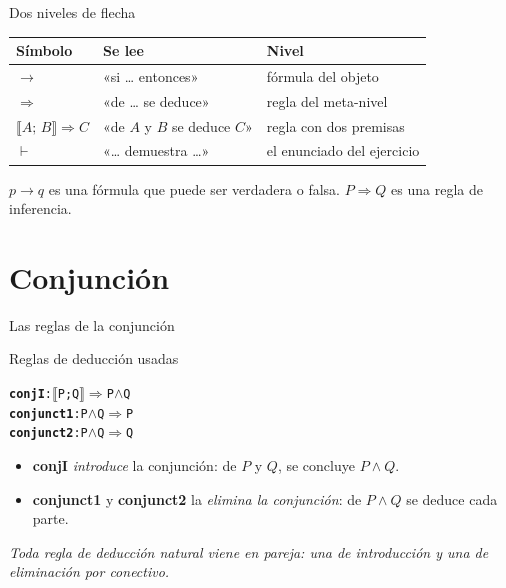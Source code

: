\documentclass[11pt,aspectratio=169]{beamer}
\newcommand{\sAnd}{\(\wedge\)}
\newcommand{\sMeta}{\(\Longrightarrow\)}
\newcommand{\sLb}{\(\llbracket\)}
\newcommand{\sRb}{\(\rrbracket\)}
\newcommand{\Rn}[1]{\textcolor{granate}{\textbf{#1}}}
\newcommand{\nota}[1]{{\small\itshape\color{gray} #1}}
\begin{document}
\begin{frame}{Dos niveles de flecha}
  \begin{center}
  \begin{tabular}{lll}
    \toprule
    \bfseries Símbolo & \bfseries Se lee & \bfseries Nivel\\
    \midrule
    \pause
    $\longrightarrow$ & «si \ldots{} entonces» & fórmula del \alert{objeto}\\
    \pause
    $\Longrightarrow$ & «de \ldots{} se deduce» & regla del \alert{meta-nivel}\\
    \pause
    $\llbracket A;\, B \rrbracket \Longrightarrow C$ & «de $A$ y $B$ se deduce $C$» & regla con dos premisas\\
    \pause
    $\vdash$ & «\ldots{} demuestra \ldots» & el enunciado del ejercicio\\
    \bottomrule
  \end{tabular}
  \end{center}
  \vfill
  \pause
  \begin{center}
    \alert{$p \longrightarrow q$ es una fórmula que puede ser verdadera o
    falsa. $P \Longrightarrow Q$ es una regla de inferencia.}
  \end{center}
\end{frame}

\section{Conjunción}

\begin{frame}[fragile]{Las reglas de la conjunción}
  \begin{block}{Reglas de deducción usadas}
\begin{alltt}\footnotesize
\Rn{conjI}:      \sLb{}P; Q\sRb{} \sMeta{} P \sAnd{} Q
\Rn{conjunct1}: P \sAnd{} Q \sMeta{} P
\Rn{conjunct2}: P \sAnd{} Q \sMeta{} Q
\end{alltt}
\end{block}
  \pause
  \begin{itemize}
    \item \Rn{conjI} \emph{introduce} la conjunción: de $P$ y $Q$, se
      concluye $P \wedge Q$.
    \pause
    \item \Rn{conjunct1} y \Rn{conjunct2} la \emph{elimina la conjunción}: de
      $P \wedge Q$ se deduce cada parte.
  \end{itemize}
  \vfill
  \pause
  \nota{Toda regla de deducción natural viene en pareja:
  una de introducción y una de eliminación por conectivo.}
\end{frame}
\end{document}
